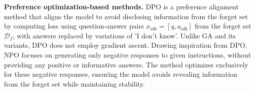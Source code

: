 %


\textbf{Preference optimization-based methods.} 
DPO \citep{rafailov2024direct} is a preference alignment method that aligns the model to avoid disclosing information from the forget set by computing loss using question-answer pairs \(x_{idk} = [q, a_{idk}]\) from the forget set \(\mathcal{D}_f\), with answers replaced by variations of 'I don't know'. Unlike GA and its variants, DPO does not employ gradient ascent. Drawing inspiration from DPO, NPO \citep{npo} focuses on generating only negative responses to given instructions, without providing any positive or informative answers. The method optimizes exclusively for these negative responses, ensuring the model avoids revealing information from the forget set while maintaining stability. 






